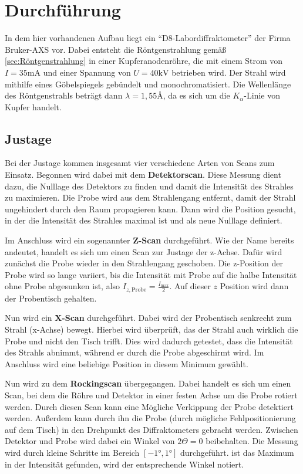 \section{Durchführung}
\label{sec:Durchführung}

In dem hier vorhandenen Aufbau liegt ein \enquote{D8-Labordiffraktometer} der Firma Bruker-AXS vor.
Dabei entsteht die Röntgenstrahlung gemäß \autoref{sec:Röntgenstrahlung} in einer Kupferanodenröhre, die mit einem Strom von $I=35\unit{\milli\ampere}$ 
und einer Spannung von $U = 40 \unit{\kilo\volt}$ betrieben wird.
Der Strahl wird mithilfe eines Göbelspiegels gebündelt und monochromatisiert.
Die Wellenlänge des Röntgenstrahls beträgt dann $\lambda = 1,55 \unit{\angstrom}$, da es sich um die $K_\alpha$-Linie von Kupfer handelt.

\subsection{Justage} \label{sec:Justage}

Bei der Justage kommen insgesamt vier verschiedene Arten von Scans zum Einsatz.
Begonnen wird dabei mit dem \textbf{Detektorscan}.
Diese Messung dient dazu, die Nulllage des Detektors zu finden und damit die Intensität des Strahles zu maximieren.
Die Probe wird aus dem Strahlengang entfernt, damit der Strahl ungehindert durch den Raum propagieren kann.
Dann wird die Position gesucht, in der die Intensität des Strahles maximal ist und als neue Nulllage definiert.

Im Anschluss wird ein sogenannter \textbf{Z-Scan} durchgeführt.
Wie der Name bereits andeutet, handelt es sich um einen Scan zur Justage der z-Achse.
Dafür wird zunächst die Probe wieder in den Strahlengang geschoben.
Die z-Position der Probe wird so lange variiert, bis die Intensität mit Probe auf die halbe Intensität ohne Probe abgesunken ist, also $I_{z,\text{Probe}} = \frac{I_\text{max}}{2}$.
Auf dieser $z$ Position wird dann der Probentisch gehalten.

Nun wird ein \textbf{X-Scan} durchgeführt.
Dabei wird der Probentisch senkrecht zum Strahl (x-Achse) bewegt.
Hierbei wird überprüft, das der Strahl auch wirklich die Probe und nicht den Tisch trifft.
Dies wird dadurch getestet, dass die Intensität des Strahls abnimmt, während er durch die Probe abgeschirmt wird.
Im Anschluss wird eine beliebige Position in diesem Minimum gewählt.   

Nun wird zu dem \textbf{Rockingscan} übergegangen.
Dabei handelt es sich um einen Scan, bei dem die Röhre und Detektor in einer festen Achse um die Probe rotiert werden.
Durch diesen Scan kann eine Mögliche Verkippung der Probe detektiert werden.
Außerdem kann durch ihn die Probe (durch mögliche Fehlpositionierung auf dem Tisch) in den Drehpunkt des Diffraktometers gebracht werden.
Zwischen Detektor und Probe wird dabei ein Winkel von $2 \Theta = 0$ beibehalten.
Die Messung wird durch kleine Schritte im Bereich $[-1°,1°]$ durchgeführt.
ist das Maximum in der Intensität gefunden, wird der entsprechende Winkel notiert.

